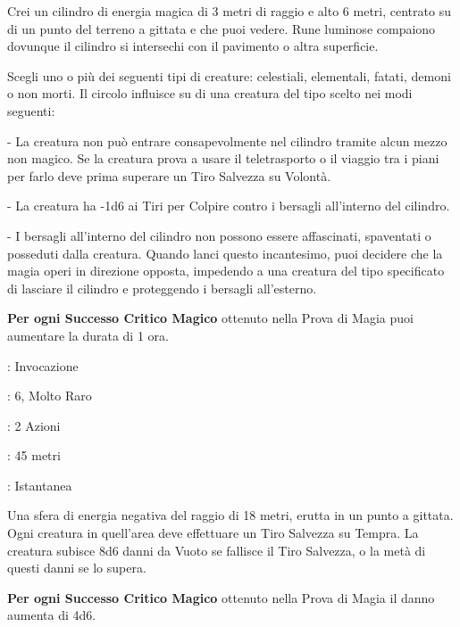 \begin{multicols}{2}
Crei un cilindro di energia magica di 3 metri di raggio e alto 6 metri, centrato su di un punto del terreno a gittata e che puoi vedere. Rune luminose compaiono dovunque il cilindro si intersechi con il pavimento o altra superficie.

Scegli uno o più dei seguenti tipi di creature: celestiali, elementali, fatati, demoni o non morti. Il circolo influisce su di una creatura del tipo scelto nei modi seguenti:

\medskip

- La creatura non può entrare consapevolmente nel cilindro tramite alcun mezzo non magico. Se la creatura prova a usare il teletrasporto o il viaggio tra i piani per farlo deve prima superare un Tiro Salvezza su Volontà.

- La creatura ha -1d6 ai Tiri per Colpire contro i bersagli all'interno del cilindro.

- I bersagli all'interno del cilindro non possono essere affascinati, spaventati o posseduti dalla creatura. Quando lanci questo incantesimo, puoi decidere che la magia operi in direzione opposta, impedendo a una creatura del tipo specificato di lasciare il cilindro e proteggendo i bersagli all'esterno.

\textbf{Per ogni Successo Critico Magico} ottenuto nella Prova di Magia puoi aumentare la durata di 1 ora.

\noindent\colorbox{OBSSgold!10}{
\begin{minipage}{0.95\linewidth}
\begin{description}[noitemsep, topsep=0pt, parsep=0pt, partopsep=0pt, leftmargin=0cm, labelwidth=1.3cm]
	\item[\textbf{Lista}]: Invocazione
	\item[\textbf{Livello}]: 6, Molto Raro
	\item[\textbf{Lancio}]: 2 Azioni
	\item[\textbf{Gittata}]: 45 metri
	\item[\textbf{Durata}]: Istantanea
\end{description}
\end{minipage}}\smallskip

Una sfera di energia negativa del raggio di 18 metri, erutta in un punto a gittata. Ogni creatura in quell'area deve effettuare un Tiro Salvezza su Tempra. La creatura subisce 8d6 danni da Vuoto se fallisce il Tiro Salvezza, o la metà di questi danni se lo supera.

\textbf{Per ogni Successo Critico Magico} ottenuto nella Prova di Magia il danno aumenta di 4d6.


\end{multicols}
